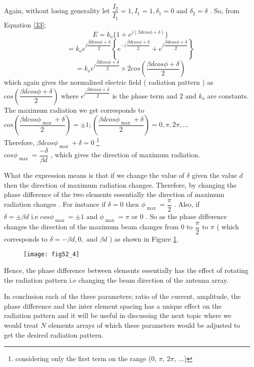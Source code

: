 Again, without losing generality let $ \dfrac{ I_2 }{ I_1 } = 1, I_1 = 1, \delta_1 = 0 \text{ and } \delta_2 = \delta $ . So, from Equation \ref{33};
$$
\quad E = k_o \{ 1 + e^{j ( \beta dcos\phi + \delta)} \}
$$
$$
\quad = k_o e^{j \dfrac{ \beta dcos\phi + \delta }{ 2 } } \left\{ e^{ -j \dfrac{ \beta dcos\phi + \delta }{ 2 } } + e^{j \dfrac{ \beta dcos\phi + \delta }{ 2 } } \right\}
$$
\begin{equation}
\quad = k_o e^{j \dfrac{ \beta dcos\phi + \delta }{ 2 } } \times 2 cos \left( \dfrac{ \beta dcos\phi + \delta }{ 2 } \right) 
\end{equation}
which again gives the normalized electric field ( radiation pattern ) as $ cos \left( \dfrac{ \beta dcos\phi + \delta }{ 2 } \right) $ where $  e^{j \dfrac{ \beta dcos\phi + \delta }{ 2 } } $ is the phase term and $ 2 \text{ and } k_o $ are constants. The maximum radiation we get corresponds to $  cos \left( \dfrac{ \beta dcos\phi_ \text{ max } + \delta }{ 2 } \right) = \pm 1 ;   \left( \dfrac{ \beta dcos\phi_ \text{ max } + \delta }{ 2 } \right) = 0, \pi, 2 \pi,... $ \\ Therefore, $\beta dcos\phi_ \text{ max } + \delta = 0 $ \footnote{considering only the first term on the range (0, $\pi$, $2\pi$, ...)}\\
$ cos\phi_\text{ max } = \dfrac{ - \delta }{ \beta d } $ , which gives the direction of maximum radiation. 

What the expression means is that if we change the value of $\delta $ given the value $d $ then the direction of maximum radiation changes. Therefore, by changing the phase difference of the two elements essentially the direction of maximum radiation changes . For instance if $ \delta = 0 $ then $ \phi_\text{ max } = \dfrac{ \pi }{ 2 } $ . Also, if $ \delta = \pm \beta d \text{ i.e } cos\phi_\text{ max } = \pm 1 $ and $ \phi_\text{ max } = \pi \text{ or } 0 $ . So as the phase difference changes the direction of the maximum beam changes from $ 0 \text{ to } \dfrac{ \pi }{ 2 } \text{ to } \pi $ ( which corresponds to $ \delta = - \beta d , 0 , \text{ and } \beta d $ ) as shown in Figure \ref{52.4}.
\begin{figure}[h]
	\texttt{[image: fig52\_4]}
	\centering
	\caption{}
	\label{52.4}
	
\end{figure}
Hence, the phase difference between elements essentially has the effect of rotating the radiation pattern i.e changing the beam direction of the antenna array.

In conclusion each of the three parameters; ratio of the  current, amplitude, the phase difference and the inter element spacing has a unique effect on the radiation pattern and it will be useful in discussing the next topic where we would treat $ N $ elements arrays of which these parameters would be adjusted to get the desired radiation pattern.
